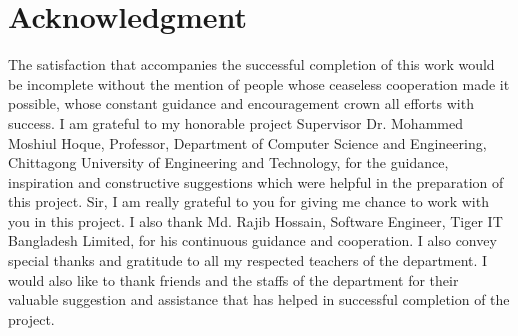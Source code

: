 \section{\hfil Acknowledgment \hfil}
\vspace{1cm}
\onehalfspacing
The satisfaction that accompanies the successful completion of this work would be incomplete without the mention of people whose ceaseless cooperation made it possible, whose constant guidance and encouragement crown all efforts with success. I am grateful to my honorable project Supervisor Dr. Mohammed Moshiul Hoque, Professor, Department of Computer Science and Engineering, Chittagong University of Engineering and Technology, for the guidance, inspiration and constructive suggestions which were helpful in the preparation of this project. Sir, I am really grateful to you for giving me chance to work with you in this project.
I also thank Md. Rajib Hossain, Software Engineer, Tiger IT Bangladesh Limited, for his continuous guidance and cooperation. 
I also convey special thanks and gratitude to all my respected teachers of the department. I would also like to thank friends and the staffs of the department for their valuable suggestion and assistance that has helped in successful completion of the project.
\clearpage